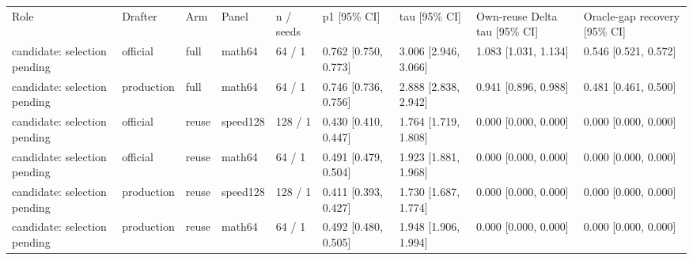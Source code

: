 \begin{tabular}{lllllllll}
Role & Drafter & Arm & Panel & n / seeds & p1 [95\% CI] & tau [95\% CI] & Own-reuse Delta tau [95\% CI] & Oracle-gap recovery [95\% CI] \\
candidate: selection pending & official & full & math64 & 64 / 1 & 0.762 [0.750, 0.773] & 3.006 [2.946, 3.066] & 1.083 [1.031, 1.134] & 0.546 [0.521, 0.572] \\
candidate: selection pending & production & full & math64 & 64 / 1 & 0.746 [0.736, 0.756] & 2.888 [2.838, 2.942] & 0.941 [0.896, 0.988] & 0.481 [0.461, 0.500] \\
candidate: selection pending & official & reuse & speed128 & 128 / 1 & 0.430 [0.410, 0.447] & 1.764 [1.719, 1.808] & 0.000 [0.000, 0.000] & 0.000 [0.000, 0.000] \\
candidate: selection pending & official & reuse & math64 & 64 / 1 & 0.491 [0.479, 0.504] & 1.923 [1.881, 1.968] & 0.000 [0.000, 0.000] & 0.000 [0.000, 0.000] \\
candidate: selection pending & production & reuse & speed128 & 128 / 1 & 0.411 [0.393, 0.427] & 1.730 [1.687, 1.774] & 0.000 [0.000, 0.000] & 0.000 [0.000, 0.000] \\
candidate: selection pending & production & reuse & math64 & 64 / 1 & 0.492 [0.480, 0.505] & 1.948 [1.906, 1.994] & 0.000 [0.000, 0.000] & 0.000 [0.000, 0.000] \\
\end{tabular}
